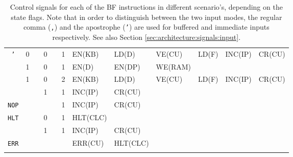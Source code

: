 \begin{longtable}[c] {c|cccc|c|llllll}
    \rowcolor{Gray}  \texttt{'}   & 0 &   & 0     &      & 1     & EN(KB)   & LD(D)    & VE(CU)  & LD(F)  & INC(IP)& CR(CU) \\
    \rowcolor{White}              & 1 &   & 0     &      & 1     & EN(D)    & EN(DP)   & WE(RAM) &        &        &        \\
    \rowcolor{White}              & 1 &   & 0     &      & 2     & EN(KB)   & LD(D)    & VE(CU)  & LD(F)  & INC(IP)& CR(CU) \\
    \rowcolor{Gray}               &   &   & 1     &      & 1     & INC(IP)  & CR(CU)   &         &        &        &        \\ \hline
    \rowcolor{White} \texttt{NOP} &   &   &       &      & 1     & INC(IP)  & CR(CU)   &         &        &        &        \\ \hline
    \rowcolor{Gray}  \texttt{HLT} &   &   & 0     &      & 1     & HLT(CLC) &          &         &        &        &        \\ 
    \rowcolor{White}              &   &   & 1     &      & 1     & INC(IP)  & CR(CU)   &         &        &        &        \\ \hline        
    \rowcolor{Gray}  \texttt{ERR} &   &   &       &      &       & ERR(CU)  & HLT(CLC) &         &        &        &        \\ \hline

    \caption{Control signals for each of the BF instructions in different scenario's, depending on the state flags. Note that in order to distinguish between the two input modes, the regular comma (\texttt{,}) and the apostrophe (\texttt{'}) are used for buffered and immediate inputs respectively. See also Section \ref{sec:architecture:signals:input}.}
    \label{tab:microcode}
  \end{longtable}
